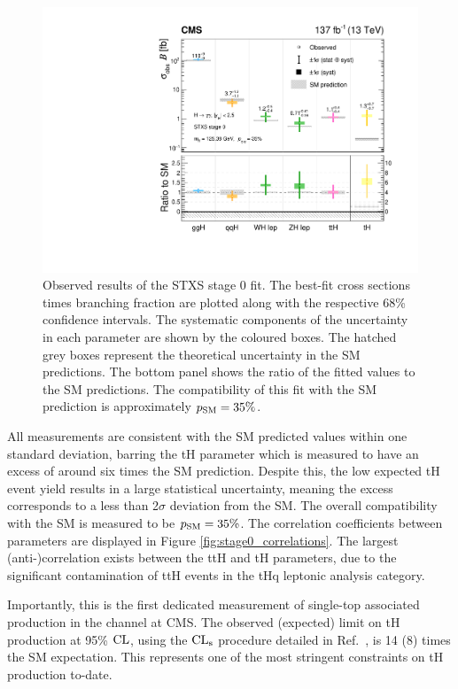 \begin{figure}
  \centering
  \includegraphics[width=.6\textwidth]{Figures/hgg_results/stage0_summary.pdf}
  \caption[Results of the STXS stage 0 fit]
  {
    Observed results of the STXS stage 0 fit. The best-fit cross sections times branching fraction are plotted along with the respective 68\% confidence intervals. The systematic components of the uncertainty in each parameter are shown by the coloured boxes. The hatched grey boxes represent the theoretical uncertainty in the SM predictions. The bottom panel shows the ratio of the fitted values to the SM predictions. The compatibility of this fit with the SM prediction is approximately $p_{\rm{SM}}=35\%$. 
  }
  \label{fig:stage0_results}
\end{figure}

All measurements are consistent with the SM predicted values within one standard deviation, barring the tH parameter which is measured to have an excess of around six times the SM prediction. Despite this, the low expected tH event yield results in a large statistical uncertainty, meaning the excess corresponds to a less than 2$\sigma$ deviation from the SM. The overall compatibility with the SM is measured to be $p_{\rm{SM}}=35\%$. The correlation coefficients between parameters are displayed in Figure \ref{fig:stage0_correlations}. The largest (anti-)correlation exists between the ttH and tH parameters, due to the significant contamination of ttH events in the tHq leptonic analysis category.

Importantly, this is the first dedicated measurement of single-top associated production in the \Hgg channel at CMS. The observed (expected) limit on tH production at 95\% $\rm{CL}$, using the $\rm{CL}_s$ procedure detailed in Ref.~\cite{CMS-NOTE-2011-005}, is 14 (8) times the SM expectation. This represents one of the most stringent constraints on tH production to-date.

